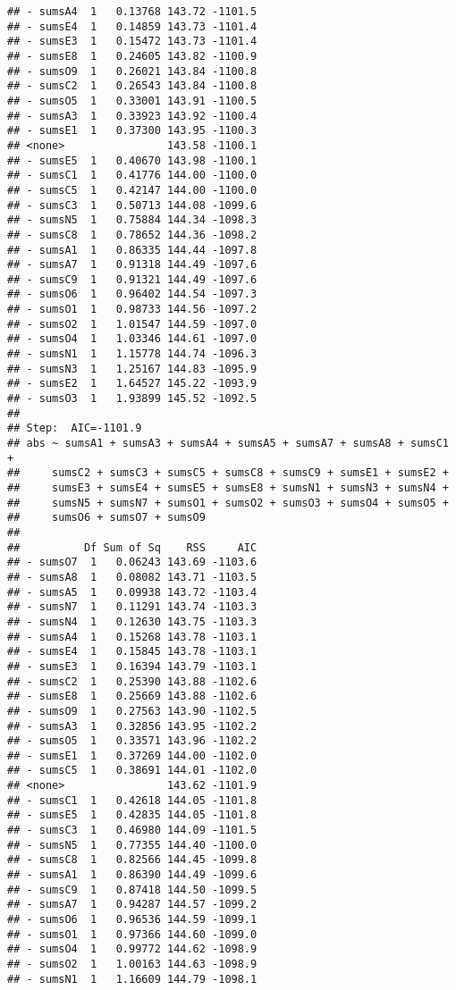 \documentclass[,man,floatsintext]{apa6}
\begin{document}
\begin{verbatim}
## - sumsA4  1   0.13768 143.72 -1101.5
## - sumsE4  1   0.14859 143.73 -1101.4
## - sumsE3  1   0.15472 143.73 -1101.4
## - sumsE8  1   0.24605 143.82 -1100.9
## - sumsO9  1   0.26021 143.84 -1100.8
## - sumsC2  1   0.26543 143.84 -1100.8
## - sumsO5  1   0.33001 143.91 -1100.5
## - sumsA3  1   0.33923 143.92 -1100.4
## - sumsE1  1   0.37300 143.95 -1100.3
## <none>                143.58 -1100.1
## - sumsE5  1   0.40670 143.98 -1100.1
## - sumsC1  1   0.41776 144.00 -1100.0
## - sumsC5  1   0.42147 144.00 -1100.0
## - sumsC3  1   0.50713 144.08 -1099.6
## - sumsN5  1   0.75884 144.34 -1098.3
## - sumsC8  1   0.78652 144.36 -1098.2
## - sumsA1  1   0.86335 144.44 -1097.8
## - sumsA7  1   0.91318 144.49 -1097.6
## - sumsC9  1   0.91321 144.49 -1097.6
## - sumsO6  1   0.96402 144.54 -1097.3
## - sumsO1  1   0.98733 144.56 -1097.2
## - sumsO2  1   1.01547 144.59 -1097.0
## - sumsO4  1   1.03346 144.61 -1097.0
## - sumsN1  1   1.15778 144.74 -1096.3
## - sumsN3  1   1.25167 144.83 -1095.9
## - sumsE2  1   1.64527 145.22 -1093.9
## - sumsO3  1   1.93899 145.52 -1092.5
## 
## Step:  AIC=-1101.9
## abs ~ sumsA1 + sumsA3 + sumsA4 + sumsA5 + sumsA7 + sumsA8 + sumsC1 + 
##     sumsC2 + sumsC3 + sumsC5 + sumsC8 + sumsC9 + sumsE1 + sumsE2 + 
##     sumsE3 + sumsE4 + sumsE5 + sumsE8 + sumsN1 + sumsN3 + sumsN4 + 
##     sumsN5 + sumsN7 + sumsO1 + sumsO2 + sumsO3 + sumsO4 + sumsO5 + 
##     sumsO6 + sumsO7 + sumsO9
## 
##          Df Sum of Sq    RSS     AIC
## - sumsO7  1   0.06243 143.69 -1103.6
## - sumsA8  1   0.08082 143.71 -1103.5
## - sumsA5  1   0.09938 143.72 -1103.4
## - sumsN7  1   0.11291 143.74 -1103.3
## - sumsN4  1   0.12630 143.75 -1103.3
## - sumsA4  1   0.15268 143.78 -1103.1
## - sumsE4  1   0.15845 143.78 -1103.1
## - sumsE3  1   0.16394 143.79 -1103.1
## - sumsC2  1   0.25390 143.88 -1102.6
## - sumsE8  1   0.25669 143.88 -1102.6
## - sumsO9  1   0.27563 143.90 -1102.5
## - sumsA3  1   0.32856 143.95 -1102.2
## - sumsO5  1   0.33571 143.96 -1102.2
## - sumsE1  1   0.37269 144.00 -1102.0
## - sumsC5  1   0.38691 144.01 -1102.0
## <none>                143.62 -1101.9
## - sumsC1  1   0.42618 144.05 -1101.8
## - sumsE5  1   0.42835 144.05 -1101.8
## - sumsC3  1   0.46980 144.09 -1101.5
## - sumsN5  1   0.77355 144.40 -1100.0
## - sumsC8  1   0.82566 144.45 -1099.8
## - sumsA1  1   0.86390 144.49 -1099.6
## - sumsC9  1   0.87418 144.50 -1099.5
## - sumsA7  1   0.94287 144.57 -1099.2
## - sumsO6  1   0.96536 144.59 -1099.1
## - sumsO1  1   0.97366 144.60 -1099.0
## - sumsO4  1   0.99772 144.62 -1098.9
## - sumsO2  1   1.00163 144.63 -1098.9
## - sumsN1  1   1.16609 144.79 -1098.1

\end{verbatim}
\end{document}

